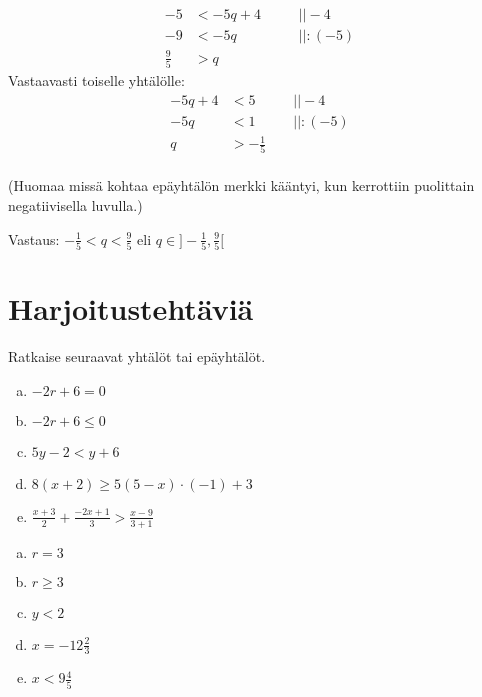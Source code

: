 \begin{align*}
-5&<-5q+4 \ \ \ \ \ &&|| -4 \\
-9&<-5q &&|| :(-5) \\
\frac95&>q
\end{align*}
Vastaavasti toiselle yhtälölle:
\begin{align*}
-5q+4&<5  \ \ \ \ \ &&|| -4 \\
-5q&<1 &&|| :(-5) \\
q&>-\frac15 \\
\end{align*}

(Huomaa missä kohtaa epäyhtälön merkki kääntyi, kun kerrottiin puolittain negatiivisella luvulla.)

Vastaus: $-\frac15<q<\frac95$ eli $q\in ]-\frac15,\frac95[$

\section{Harjoitustehtäviä}
\begin{tehtava}
    Ratkaise seuraavat yhtälöt tai epäyhtälöt.
    \begin{enumerate}[a)]
        \item $-2r+6=0$
        \item $-2r+6\leq 0$
        \item $5y-2<y+6$
        \item $8(x+2)\geq 5(5-x)\cdot (-1)+3$
        \item $\frac{x+3}{2}+\frac{-2x+1}{3}>\frac{x-9}{3+1}$
    \end{enumerate}
    \begin{vastaus}
        \begin{enumerate}[a)]
            \item $r=3$
            \item $r\geq 3$
            \item $y<2$
            \item $x=-12\frac{2}{3}$
            \item $x<9\frac{4}{5}$
        \end{enumerate}
    \end{vastaus}
\end{tehtava}

